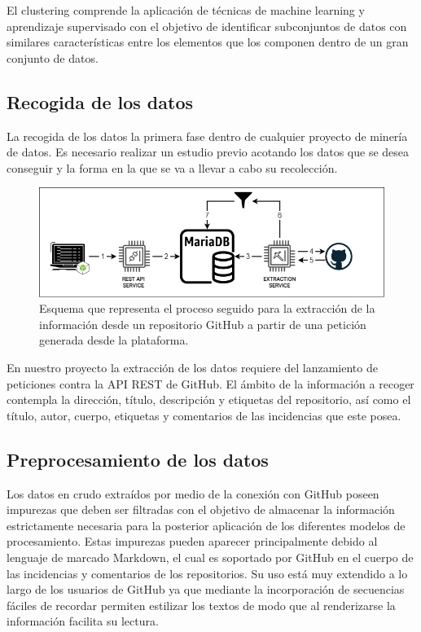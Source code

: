 El clustering comprende la aplicación de técnicas de machine learning y aprendizaje supervisado con el objetivo de identificar subconjuntos de datos con similares características entre los elementos que los componen dentro de un gran conjunto de datos.

\subsection{Recogida de los datos} \label{sec:extraccion}

La recogida de los datos la primera fase dentro de cualquier proyecto de minería de datos. Es necesario realizar un estudio previo acotando los datos que se desea conseguir y la forma en la que se va a llevar a cabo su recolección.

\begin{figure}[!ht]
	\centering
\includegraphics[width=\textwidth]{img/extraction_process.png}
	\caption{Esquema que representa el proceso seguido para la extracción de la información desde un repositorio GitHub a partir de una petición generada desde la plataforma.}
	\label{fig:extraction_process}
\end{figure}

En nuestro proyecto la extracción de los datos requiere del lanzamiento de peticiones contra la API REST de GitHub. El ámbito de la información a recoger contempla la dirección, título, descripción y etiquetas del repositorio, así como el título, autor, cuerpo, etiquetas y comentarios de las incidencias que este posea.

\subsection{Preprocesamiento de los datos} \label{sec:preprocesamiento}

Los datos en crudo extraídos por medio de la conexión con GitHub poseen impurezas que deben ser filtradas con el objetivo de almacenar la información estrictamente necesaria para la posterior aplicación de los diferentes modelos de procesamiento. Estas impurezas pueden aparecer principalmente debido al lenguaje de marcado Markdown, el cual es soportado por GitHub en el cuerpo de las incidencias y comentarios de los repositorios. Su uso está muy extendido a lo largo de los usuarios de GitHub ya que mediante la incorporación de secuencias fáciles de recordar permiten estilizar los textos de modo que al renderizarse la información facilita su lectura.

